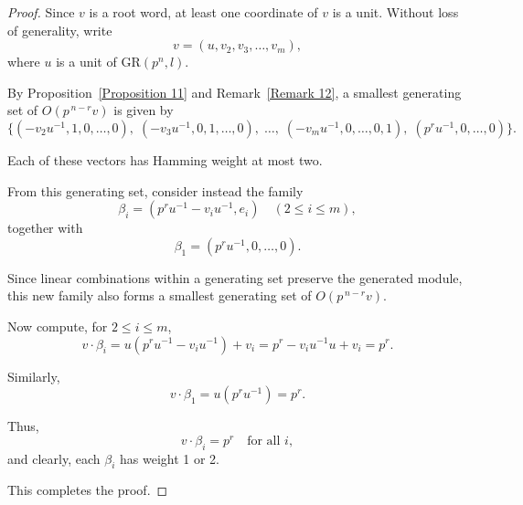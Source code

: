 \documentclass[10pt,a4paper]{amsart}
\begin{document}
\begin{proof}
Since $v$ is a root word, at least one coordinate of $v$ is a unit.
Without loss of generality, write
\[
v=(u,v_2,v_3,\dots,v_m),
\]
where $u$ is a unit of $\mathrm{GR}(p^n,l)$.

By Proposition~\ref{Proposition 11}
and Remark~\ref{Remark 12},
a smallest generating set of $O(p^{\,n-r}v)$ is given by
\[
\Big\{
(-v_2u^{-1},1,0,\dots,0),\;
(-v_3u^{-1},0,1,\dots,0),\;
\dots,\;
(-v_mu^{-1},0,\dots,0,1),\;
(p^ru^{-1},0,\dots,0)
\Big\}.
\]

Each of these vectors has Hamming weight at most two.

From this generating set, consider instead the family
\[
\beta_i=
(p^ru^{-1}-v_iu^{-1},e_i)
\quad (2\le i\le m),
\]
together with
\[
\beta_1=(p^ru^{-1},0,\dots,0).
\]

Since linear combinations within a generating set preserve
the generated module, this new family also forms
a smallest generating set of $O(p^{\,n-r}v)$.

Now compute, for $2\le i\le m$,
\[
v\cdot \beta_i
=
u(p^ru^{-1}-v_iu^{-1})
+
v_i
=
p^r - v_i u^{-1}u + v_i
=
p^r.
\]

Similarly,
\[
v\cdot \beta_1
=
u(p^ru^{-1})
=
p^r.
\]

Thus,
\[
v\cdot \beta_i=p^r
\quad \text{for all } i,
\]
and clearly, each $\beta_i$ has weight 1 or 2.

This completes the proof.
\end{proof}
\end{document}
